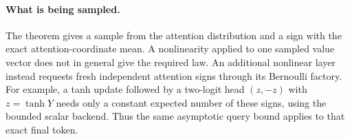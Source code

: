 \paragraph{What is being sampled.}
The theorem gives a sample from the attention distribution and a
sign with the exact attention-coordinate mean. A nonlinearity applied
to one sampled value vector does not in general give the required
law. An additional nonlinear layer instead requests fresh
independent attention signs through its Bernoulli factory. For
example, a tanh update followed by a two-logit head $(z,-z)$ with
$z=\tanh Y$ needs only a constant expected number of these signs,
using the bounded scalar backend. Thus the same asymptotic query
bound applies to that exact final token.
